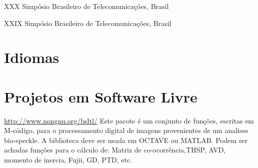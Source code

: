 \documentclass[11pt,a4paper,sans]{moderncv} %
\begin{document}
	      {}{}{}
	      {XXX Simpósio Brasileiro de Telecomunicações, Brasil}

	      {}{}{}
	      {XXIX Simpósio Brasileiro de Telecomunicações, Brasil}







\section{Idiomas}


 
\section{Projetos em Software Livre}

			{\url{http://www.nongnu.org/bsltl/}}
			{}{}
			{Este pacote é um conjunto de funções, escritas em M-código, para o 
			processamento digital de imagens provenientes de um analises bio-speckle.
			A biblioteca deve ser usada em OCTAVE ou MATLAB.
			Podem ser achadas funções para o cálculo de: 
			Matriz de co-ocorrência,THSP, AVD, momento de inercia,
			Fujii, GD, PTD, etc.}
\end{document}
